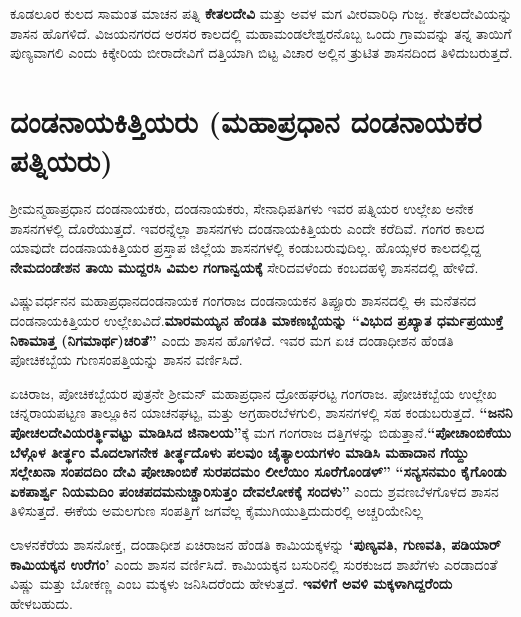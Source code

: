 ಕೂಡಲೂರ ಕುಲದ ಸಾಮಂತ ಮಾಚನ ಪತ್ನಿ \textbf{ಕೇತಲದೇವಿ} ಮತ್ತು ಅವಳ ಮಗ ವೀರವಾರಿಧಿ ಗುಜ್ಜ. ಕೇತಲದೇವಿಯನ್ನು ಶಾಸನ ಹೊಗಳಿದೆ. ವಿಜಯನಗರದ ಅರಸರ ಕಾಲದಲ್ಲಿ ಮಹಾಮಂಡಲೇಶ್ವರನೊಬ್ಬ ಒಂದು ಗ್ರಾಮವನ್ನು ತನ್ನ ತಾಯಿಗೆ ಪುಣ್ಯವಾಗಲಿ ಎಂದು ಕಿಕ್ಕೇರಿಯ ಬೀರಾದೇವಿಗೆ ದತ್ತಿಯಾಗಿ ಬಿಟ್ಟ ವಿಚಾರ ಅಲ್ಲಿನ ತ್ರುಟಿತ ಶಾಸನದಿಂದ ತಿಳಿದುಬರುತ್ತದೆ.

\section*{ದಂಡನಾಯಕಿತ್ತಿಯರು (ಮಹಾಪ್ರಧಾನ ದಂಡನಾಯಕರ ಪತ್ನಿಯರು)}

ಶ‍್ರೀಮನ್ಮಹಾಪ್ರಧಾನ ದಂಡನಾಯಕರು, ದಂಡನಾಯಕರು, ಸೇನಾಧಿಪತಿಗಳು ಇವರ ಪತ್ನಿಯರ ಉಲ್ಲೇಖ ಅನೇಕ ಶಾಸನಗಳಲ್ಲಿ ದೊರೆಯುತ್ತದೆ. ಇವರನ್ನೆಲ್ಲಾ ಶಾಸನಗಳು ದಂಡನಾಯಕಿತ್ತಿಯರು ಎಂದೇ ಕರೆದಿವೆ. ಗಂಗರ ಕಾಲದ ಯಾವುದೇ ದಂಡನಾಯಕಿತ್ತಿಯರ ಪ್ರಸ್ತಾಪ ಜಿಲ್ಲೆಯ ಶಾಸನಗಳಲ್ಲಿ ಕಂಡುಬರುವುದಿಲ್ಲ. ಹೊಯ್ಸಳರ ಕಾಲದಲ್ಲಿದ್ದ \textbf{ನೇಮದಂಡೇಶನ ತಾಯಿ ಮುದ್ದರಸಿ ವಿಮಲ ಗಂಗಾನ್ವಯಕ್ಕೆ} ಸೇರಿದವಳೆಂದು ಕಂಬದಹಳ್ಳಿ ಶಾಸನದಲ್ಲಿ ಹೇಳಿದೆ.

ವಿಷ್ಣುವರ್ಧನನ ಮಹಾಪ್ರಧಾನದಂಡನಾಯಕ ಗಂಗರಾಜ ದಂಡನಾಯಕನ ತಿಪ್ಪೂರು ಶಾಸನದಲ್ಲಿ ಈ ಮನೆತನದ ದಂಡನಾಯಕಿತ್ತಿಯರ ಉಲ್ಲೇಖವಿದೆ.\textbf{ಮಾರಮಯ್ಯನ ಹೆಂಡತಿ ಮಾಕಣಬ್ಬೆಯನ್ನು “ವಿಭುದ ಪ್ರಖ್ಯಾತ ಧರ್ಮಪ್ರಯುಕ್ತೆ ನಿಕಾಮಾತ್ತ (ನಿಗಮಾರ್ಥ)ಚರಿತೆ”} ಎಂದು ಶಾಸನ ಹೊಗಳಿದೆ. ಇವರ ಮಗ ಏಚ ದಂಡಾಧೀಶನ ಹೆಂಡತಿ ಪೋಚಿಕಬ್ಬೆಯ ಗುಣಸಂಪತ್ತಿಯನ್ನು ಶಾಸನ ವರ್ಣಿಸಿದೆ.

ಏಚಿರಾಜ, ಪೋಚಿಕಬ್ಬೆಯರ ಪುತ್ರನೇ ಶ‍್ರೀಮನ್​ ಮಹಾಪ್ರಧಾನ ದ್ರೋಹಘರಟ್ಟ ಗಂಗರಾಜ. ಪೋಚಿಕಬ್ಬೆಯ ಉಲ್ಲೇಖ ಚನ್ನರಾಯಪಟ್ಟಣ ತಾಲ್ಲೂಕಿನ ಯಾಚನಘಟ್ಟ, ಮತ್ತು ಅಗ್ರಹಾರಬೆಳಗುಲಿ, ಶಾಸನಗಳಲ್ಲಿ ಸಹ ಕಂಡುಬರುತ್ತದೆ. \textbf{“ಜನನಿ ಪೋಚಲದೇವಿಯರರ್ತ್ಥಿವಟ್ಟು ಮಾಡಿಸಿದ ಜಿನಾಲಯ”}ಕ್ಕೆ ಮಗ ಗಂಗರಾಜ ದತ್ತಿಗಳನ್ನು ಬಿಡುತ್ತಾನೆ.\break \textbf{“ಪೋಚಾಂಬಿಕೆಯು ಬೆಳ್ಗೊಳ ತೀರ್ತ್ಥಂ ಮೊದಲಾಗನೇಕ ತೀರ್ತ್ಥದೊಳು ಪಲವುಂ ಚೈತ್ಯಾಲಯಗಳಂ ಮಾಡಿಸಿ ಮಹಾದಾನ ಗೆಯ್ದು ಸಲ್ಲೇಖನಾ ಸಂಪದದಿಂ ದೇವಿ ಪೋಚಾಂಬಿಕೆ ಸುರಪದಮಂ ಲೀಲೆಯಿಂ ಸೂರೆಗೊಂಡಳ್​”} \textbf{“ಸನ್ಯಸನಮಂ ಕೈಗೊಂಡು ಏಕಪಾರ್ಶ್ವ ನಿಯಮದಿಂ ಪಂಚಪದಮನುಚ್ಚಾರಿಸುತ್ತಂ ದೇವಲೋಕಕ್ಕೆ ಸಂದಳು”} ಎಂದು ಶ್ರವಣಬೆಳಗೊಳದ ಶಾಸನ ತಿಳಿಸುತ್ತದೆ. ಈಕೆಯ ಅಮಲಗುಣ ಸಂಪತ್ತಿಗೆ ಜಗವೆಲ್ಲ ಕೈಮುಗಿಯುತ್ತಿದುದುರಲ್ಲಿ ಅಚ್ಚರಿಯೇನಿಲ್ಲ

ಲಾಳನಕೆರೆಯ ಶಾಸನೋಕ್ತ, ದಂಡಾಧೀಶ ಏಚಿರಾಜನ ಹೆಂಡತಿ ಕಾಮಿಯಕ್ಕಳನ್ನು \textbf{‘ಪುಣ್ಯವತಿ, ಗುಣವತಿ, ಪಡಿಯಾರ್​ ಕಾಮಿಯಕ್ಕನ ಉರೆಗಂ’} ಎಂದು ಶಾಸನ ವರ್ಣಿಸಿದೆ. ಕಾಮಿಯಕ್ಕನ ಬಸುರಿನಲ್ಲಿ ಸುರಕುಜದ ಶಾಖೆಗಳು ಎರಡಾದಂತೆ ವಿಷ್ಣು ಮತ್ತು ಬೋಕಣ್ಣ ಎಂಬ ಮಕ್ಕಳು ಜನಿಸಿದರೆಂದು ಹೇಳುತ್ತದೆ. \textbf{ಇವಳಿಗೆ ಅವಳಿ ಮಕ್ಕಳಾಗಿದ್ದರೆಂದು} ಹೇಳಬಹುದು.

